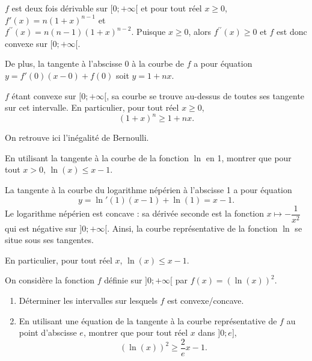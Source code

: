 \documentclass[11pt,fleqn, openany]{book} %
\begin{document}
\begin{solution}\(f\) est deux fois dérivable sur \([0;+\infty[\) et pour tout réel \(x\geqslant 0\), \(f'(x)=n(1+x)^{n-1}\) et \\ \(f^{\prime\prime}(x)=n(n-1)(1+x)^{n-2}\). Puisque $x\geqslant 0$, alors \(f^{\prime\prime}(x) \geqslant 0\) et \(f\) est donc convexe sur \([0;+\infty[\).

De plus, la tangente à l'abscisse 0 à la courbe de \(f\) a pour équation \(y=f'(0)(x-0)+f(0)\) soit \(y=1+nx\).

\(f\) étant convexe sur \([0;+\infty[\), sa courbe se trouve au-dessus de toutes ses tangente sur cet intervalle. En particulier, pour tout réel \(x\geqslant 0\), 
\[(1+x)^n \geqslant 1+nx .\]

On retrouve ici l'inégalité de Bernoulli.\end{solution}



\begin{exercise}En utilisant la tangente à la courbe de la fonction $\ln$ en 1, montrer que pour tout $x>0$, $\ln(x) \leqslant x -1$.\end{exercise}

\begin{solution}
La tangente à la courbe du logarithme népérien à l'abscisse 1 a pour équation
\[ y =\ln'(1)(x-1)+\ln(1)=x-1.\]
Le logarithme népérien est concave : sa dérivée seconde est la fonction \(x\mapsto -\dfrac{1}{x^2}\) qui est négative sur \(]0;+\infty[\). Ainsi, la courbe représentative de la fonction \(\ln\) se situe sous ses tangentes.

En particulier, pour tout réel \(x\), \(\ln(x) \leqslant x-1\).\end{solution}



\begin{exercise}On considère la fonction $f$ définie sur $]0;+\infty[$ par $f(x)=(\ln(x))^2$.
\begin{enumerate}
\item Déterminer les intervalles sur lesquels $f$ est convexe/concave.
\item En utilisant une équation de la tangente à la courbe représentative de $f$ au point d'abscisse $e$, montrer que pour tout réel $x$ dans $]0;e]$,
\[(\ln(x))^2\geqslant \dfrac{2}{e}x-1.\]
\end{enumerate}\end{exercise}
\end{document}
